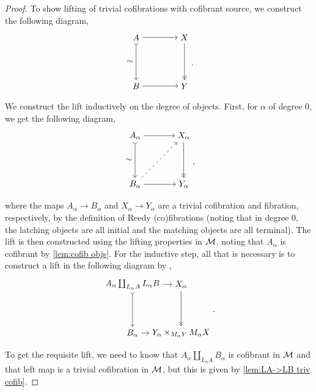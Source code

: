 \documentclass{amsart}
\begin{document}
\begin{proof}
    To show lifting of trivial cofibrations with cofibrant source, we construct the following diagram,
    \[\begin{matrix}\begin{tikzpicture}
        \node (A) at (0,0) {$A$};
        \node (X) at (2,0) {$X$};
        \node (B) at (0,-2) {$B$};
        \node (Y) at (2,-2) {$Y$};
        \draw[>->] (A) to node[left]{$\sim$} (B);
        \draw[->] (A) to (X);
        \draw[->>] (X) to (Y);
        \draw[->] (B) to (Y);
    \end{tikzpicture}\end{matrix}.\]
    We construct the lift inductively on the degree of objects. First, for $\alpha$ of degree 0, we get the following diagram,
    \[\begin{matrix}\begin{tikzpicture}
        \node (A) at (0,0) {$A_\alpha$};
        \node (X) at (2,0) {$X_\alpha$};
        \node (B) at (0,-2) {$B_\alpha$};
        \node (Y) at (2,-2) {$Y_\alpha$};
        \draw[>->] (A) to node[left]{$\sim$} (B);
        \draw[->] (A) to (X);
        \draw[->>] (X) to (Y);
        \draw[->] (B) to (Y);
        \draw[->, dashed] (B) to (X);
    \end{tikzpicture}\end{matrix},\]
    where the maps $A_\alpha\to B_\alpha$ and $X_\alpha\to Y_\alpha$ are a trivial cofibration and fibration, respectively, by the definition of Reedy (co)fibrations (noting that in degree 0, the latching objects are all initial and the matching objects are all terminal). The lift is then constructed using the lifting properties in $\mathcal{M}$, noting that $A_\alpha$ is cofibrant by \ref{lem:cofib objs}. For the inductive step, all that is necessary is to construct a lift in the following diagram by \cite[15.2.11]{Hirshhorn},
    \[\begin{matrix}\begin{tikzpicture}
        \node (A) at (0,0) {$A_\alpha\coprod_{L_\alpha A}L_\alpha B$};
        \node (X) at (2,0) {$X_\alpha$};
        \node (B) at (0,-2) {$B_\alpha$};
        \node (Y) at (2,-2) {$Y_\alpha\times_{M_\alpha Y}M_\alpha X$};
        \draw[>->] (A) to (B);
        \draw[->] (A) to (X);
        \draw[->>] (X) to (Y);
        \draw[->] (B) to (Y);
    \end{tikzpicture}\end{matrix}.\]
    To get the requisite lift, we need to know that $A_\alpha\coprod_{L_\alpha A}B_\alpha$ is cofibrant in $\mathcal{M}$ and that left map is a trivial cofibration in $\mathcal{M}$, but this is given by \ref{lem:LA->LB triv cofib}.


\end{proof}
\end{document}
